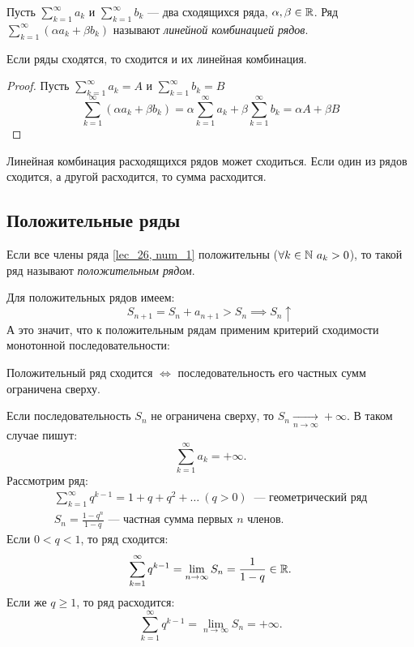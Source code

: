 \documentclass[../../main.tex]{subfiles}
\begin{document}
Пусть $\sum\limits_{k = 1}^\infty a_k$  и $\sum\limits_{k = 1}^\infty b_k$
 --- два сходящихся ряда, $\alpha, \beta \in \mathbb{R}$.
Ряд $\sum\limits_{k = 1}^\infty(\alpha a_k + \beta b_k)$
 называют \emph{линейной комбинацией рядов}. 
\begin{thm}
Если ряды сходятся, то сходится и их линейная комбинация.
 \end{thm}
\begin{proof}
	Пусть  $\sum\limits_{k = 1}^\infty a_k = A$  
	и $\sum\limits_{k = 1}^\infty b_k = B$
 	\[
 		\sum\limits_{k = 1}^\infty(\alpha a_k + \beta b_k) =
 		\alpha\sum\limits_{k = 1}^\infty a_k + 
 		\beta\sum\limits_{k = 1}^\infty b_k = \alpha A + 
 		\beta B
 	\]
 \end{proof}
 Линейная комбинация расходящихся рядов может сходиться.
 Если один из рядов сходится, а другой расходится, то 
 сумма расходится.
 \subsection{Положительные ряды}
\begin{definition}
Если все члены ряда \eqref{lec_26, num_1} положительны
($\forall k \in \N \ a_k > 0$),
то такой ряд называют \emph{положительным рядом}.
\end{definition}
Для положительных рядов имеем:
\[
	S_{n+1} = S_n + a_{n+1}  > S_n \implies S_n \uparrow
\]
А это значит, что к положительным рядам применим 
критерий сходимости монотонной последовательности:
 \begin{thm} 
 	\label{lec26:pos_series}
 	 Положительный ряд сходится $\iff$ последовательность 
 	его частных сумм ограничена сверху.
 \end{thm}
 \begin{rem}
 	 Если  последовательность $S_n$ не ограничена сверху, 
 	 то  $S_n\xrightarrow[n \to \infty]{}+\infty$. В таком случае пишут:
 	 \[
 		\sum\limits_{k = 1}^\infty a_k= +\infty
	.\]
	Рассмотрим ряд:
	 \begin{gather*}
 		\sum\limits_{k = 1}^\infty q^{k-1}=  1 + q + q^2 + \ldots
 		\ (q > 0)\ \text{ --- геометрический ряд}\\
 		S_n = \frac{1 - q^n}{1 - q} \text{ --- частная сумма первых $n$ членов}
	.\end{gather*}
	Если $0 < q < 1$, то ряд сходится:
	\[
	\sum\limits_{k = 1}^\infty q^{k-1} = \lim\limits_{n \to \infty} S_n =
	\frac{1}{1 - q} \in \mathbb{R}
	.\]
	Если же $q \geq 1$, то ряд расходится:
	\[
	\sum\limits_{k = 1}^\infty q^{k-1} = \lim\limits_{n \to \infty} S_n =
	+ \infty
	.\]
 \end{rem}
\end{document}
